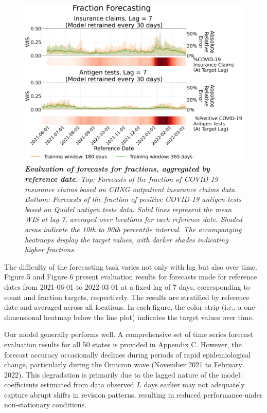 \begin{figure}[h!]
    \centering
    \includegraphics[width=\textwidth]{figs/experiment_fraction_result_time_series.pdf}
    \caption{\emph{\textbf{Evaluation of forecasts for fractions, aggregated by reference date.} Top: Forecasts of the fraction of COVID-19 insurance claims based on CHNG outpatient insurance claims data. Bottom: Forecasts of the fraction of positive COVID-19 antigen tests based on Quidel antigen tests data. Solid lines represent the mean WIS at lag 7, averaged over locations for each reference date. Shaded areas indicate the 10th to 90th percentile interval. The accompanying heatmaps display the target values, with darker shades indicating higher fractions.}}
\end{figure}

The difficulty of the forecasting task varies not only with lag but also over time. Figure 5 and Figure 6 present evaluation results for forecasts made for reference dates from 2021-06-01 to 2022-03-01 at a fixed lag of 7 days, corresponding to count and fraction targets, respectively. The results are stratified by reference date and averaged across all locations. In each figure, the color strip (i.e., a one-dimensional heatmap below the line plot) indicates the target values over time.

Our model generally performs well. A comprehensive set of time series forecast evaluation results for all 50 states is provided in Appendix C. However, the forecast accuracy occasionally declines during periods of rapid epidemiological change, particularly during the Omicron wave (November 2021 to February 2022). This degradation is primarily due to the lagged nature of the model: coefficients estimated from data observed \( L \) days earlier may not adequately capture abrupt shifts in revision patterns, resulting in reduced performance under non-stationary conditions.

